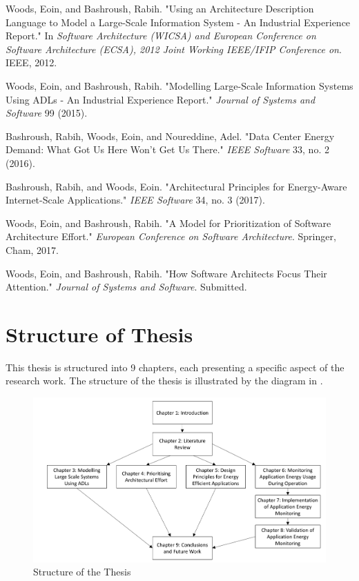 \begin{description}
	\item Woods, Eoin, and Bashroush, Rabih. "Using an Architecture Description Language to Model a Large-Scale Information System - An Industrial Experience Report." In \emph{Software Architecture (WICSA) and European Conference on Software Architecture (ECSA), 2012 Joint Working IEEE/IFIP Conference on}. IEEE, 2012.
	\item Woods, Eoin, and Bashroush, Rabih. "Modelling Large-Scale Information Systems Using ADLs - An Industrial Experience Report." \emph{Journal of Systems and Software} 99 (2015).
	\item Bashroush, Rabih, Woods, Eoin, and Noureddine, Adel. "Data Center Energy Demand: What Got Us Here Won't Get Us There." \emph{IEEE Software} 33, no. 2 (2016).
	\item Bashroush, Rabih, and Woods, Eoin. "Architectural Principles for Energy-Aware Internet-Scale Applications." \emph{IEEE Software} 34, no. 3 (2017).
	\item Woods, Eoin, and Bashroush, Rabih. "A Model for Prioritization of Software Architecture Effort." \emph{European Conference on Software Architecture}. Springer, Cham, 2017.
	\item Woods, Eoin, and Bashroush, Rabih. "How Software Architects Focus Their Attention." \emph{Journal of Systems and Software}.  Submitted.
\end{description}


\section{Structure of Thesis}

This thesis is structured into 9 chapters, each presenting a specific aspect of the research work.  The structure of the thesis is illustrated by the diagram in .

\begin{figure}[h]
\centering
\includegraphics[width=1.0\textwidth]{Figures/intro-chapters}
\caption{Structure of the Thesis}
\label{figure:intro-chapters}
\end{figure}

